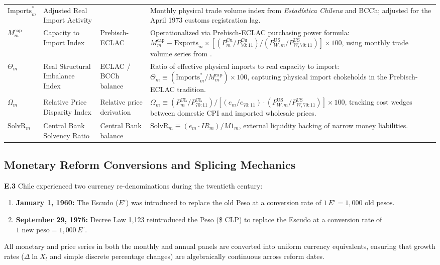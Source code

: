 \begin{table}[htbp]
\begin{tabularx}{\textwidth}{p{2.2cm}p{3.0cm}p{2.6cm}X}
$\text{Imports}^*_m$ & Adjusted Real Import Activity & \citet{DiazBahamonde2023} & Monthly physical trade volume index from \textit{Estadística Chilena} and BCCh; adjusted for the April 1973 customs registration lag. \\
$M^{\text{cap}}_m$ & Capacity to Import Index & Prebisch-ECLAC & Operationalized via Prebisch-ECLAC purchasing power formula: $M^{\text{cap}}_m \equiv \text{Exports}_m \times [(P^{\text{Cu}}_m / P^{\text{Cu}}_{70:11}) / (P^{\text{US}}_{W,m} / P^{\text{US}}_{W,70:11})] \times 100$, using monthly trade volume series from \citet{DiazBahamonde2023}. \\
$\Theta_m$ & Real Structural Imbalance Index & ECLAC / BCCh balance & Ratio of effective physical imports to real capacity to import: $\Theta_m \equiv (\text{Imports}^*_m / M^{\text{cap}}_m) \times 100$, capturing physical import chokeholds in the Prebisch-ECLAC tradition. \\
$\Omega_m$ & Relative Price Disparity Index & Relative price derivation & $\Omega_m \equiv (P^{\text{CL}}_m / P^{\text{CL}}_{70:11}) / [(e_m / e_{70:11}) \cdot (P^{\text{US}}_{W,m} / P^{\text{US}}_{W,70:11})] \times 100$, tracking cost wedges between domestic CPI and imported wholesale prices. \\
$\text{SolvR}_m$ & Central Bank Solvency Ratio & Central Bank balance & $\text{SolvR}_m \equiv (e_m \cdot IR_m) / M1_m$, external liquidity backing of narrow money liabilities. \\
\bottomrule
\end{tabularx}
\end{table}

\subsection{Monetary Reform Conversions and Splicing Mechanics}
\label{app:monetary_reforms}

\textbf{E.3} Chile experienced two currency re-denominations during the twentieth century:
\begin{enumerate}[leftmargin=2em]
	\item \textbf{January 1, 1960:} The Escudo ($E^\circ$) was introduced to replace the old Peso at a conversion rate of $1\,E^\circ = 1,000\text{ old pesos}$.
	\item \textbf{September 29, 1975:} Decree Law 1,123 reintroduced the Peso (\$ CLP) to replace the Escudo at a conversion rate of $1\text{ new peso} = 1,000\,E^\circ$.
\end{enumerate}
All monetary and price series in both the monthly and annual panels are converted into uniform currency equivalents, ensuring that growth rates ($\Delta \ln X_t$ and simple discrete percentage changes) are algebraically continuous across reform dates.
